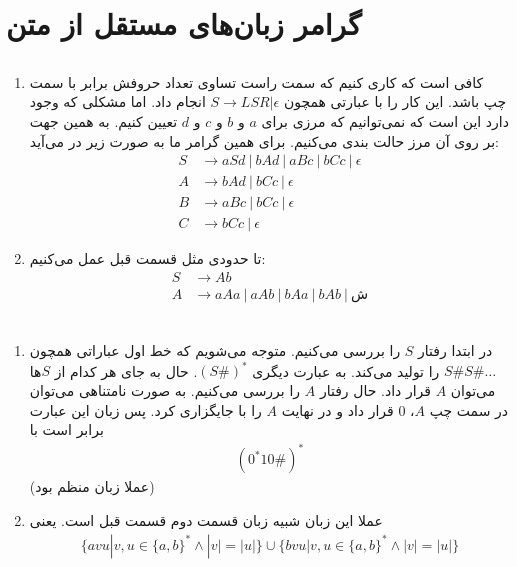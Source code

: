\section{گرامر زبان‌های مستقل از متن}
\subsection{}
\begin{enumerate}
    \item کافی است که کاری کنیم که سمت راست تساوی تعداد حروفش برابر با سمت چپ باشد. این کار را با
    عبارتی همچون
    $S \rightarrow LSR | \epsilon$
    انجام داد. اما مشکلی که وجود دارد این است که نمی‌توانیم که مرزی برای
    $a$ و $b$
    و
    $c$ و $d$
    تعیین کنیم. به همین جهت بر روی آن مرز حالت بندی می‌کنیم. برای همین گرامر ما به صورت زیر در می‌آید:
    \begin{align*}
        S &\rightarrow aSd ~|~ bAd ~|~ aBc ~|~ bCc ~|~ \epsilon\\
        A &\rightarrow bAd ~|~ bCc ~|~ \epsilon\\
        B &\rightarrow aBc ~|~ bCc ~|~ \epsilon\\
        C &\rightarrow bCc ~|~ \epsilon
    \end{align*}
    \item تا حدودی مثل قسمت قبل عمل می‌کنیم:
    \begin{align*}
        S &\rightarrow Ab\\
        A &\rightarrow aAa ~|~ aAb ~|~ bAa ~|~ bAb ~|~ ش\\
    \end{align*}
\end{enumerate}
\subsection{}
\begin{enumerate}
    \item در ابتدا رفتار
    $S$
    را بررسی می‌کنیم. متوجه می‌شویم که خط اول عباراتی همچون
    $S\#S\#\dots$
    را تولید می‌کند. به عبارت دیگری
    $(S\#)^*$.
    حال به جای هر کدام از
    $S$ها
    می‌توان
    $A$
    قرار داد. حال رفتار
    $A$
    را بررسی می‌کنیم. به صورت نامتناهی می‌توان در سمت چپ
    $A$، 0 قرار داد
    و در نهایت
    $A$
    را با
    جایگزاری کرد. پس زبان این عبارت برابر است با
    \begin{gather*}
        (0^*10\#)^*
    \end{gather*}
    (عملا زبان منظم بود)
    \item عملا این زبان شبیه زبان قسمت دوم قسمت قبل است. یعنی
    \begin{gather*}
        \{avu | v, u \in \{a, b\}^* \land |v| = |u|\} \cup \{bvu | v, u \in \{a, b\}^* \land |v| = |u|\}
    \end{gather*}
\end{enumerate}
\subsection{}
